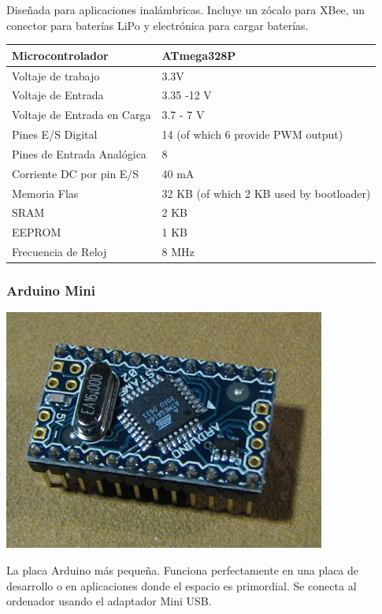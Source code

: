 \documentclass[12pt,a4papert,woside,openright,titlepage,final]{book}
\begin{document}
Diseñada para aplicaciones inalámbricas. Incluye un zócalo para XBee, un
conector para baterías LiPo y electrónica para cargar baterías. 

\begin{tabular}{||l | l ||}
\hline
\hline
Microcontrolador & ATmega328P\\
\hline
Voltaje de trabajo & 3.3V\\
\hline
Voltaje de Entrada & 3.35 -12 V\\
\hline
Voltaje de Entrada en Carga & 3.7 - 7 V\\
\hline
Pines E/S Digital & 14 (of which 6 provide PWM output)\\
\hline
Pines de Entrada Analógica & 8\\
\hline
Corriente DC por pin E/S & 40 mA\\
\hline
Memoria Flas & 	32 KB (of which 2 KB used by bootloader)\\
\hline
SRAM & 2 KB\\
\hline
EEPROM & 1 KB\\
\hline
Frecuencia de Reloj & 8 MHz\\
\hline
\hline
\end{tabular}

\subsubsection{Arduino Mini}

\includegraphics[scale=0.6]{arduino_mini.jpg}

La placa Arduino más pequeña. Funciona perfectamente en una placa de desarrollo
o en aplicaciones donde el espacio es primordial. Se conecta al ordenador usando
el adaptador Mini USB. 
\end{document}
